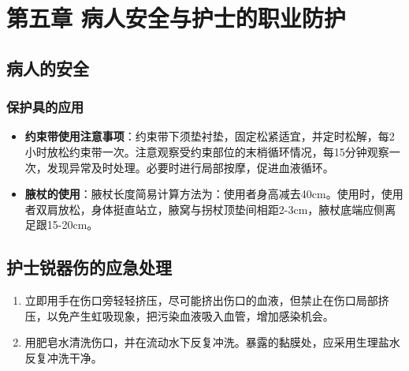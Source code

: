 \documentclass[11pt, a4paper]{ctexart}
\begin{document}
\section{第五章 病人安全与护士的职业防护}
\subsection{病人的安全}
\subsubsection{保护具的应用}
\begin{itemize}
	\item \textbf{约束带使用注意事项}：约束带下须垫衬垫，固定松紧适宜，并定时松解，每2小时放松约束带一次。注意观察受约束部位的末梢循环情况，每15分钟观察一次，发现异常及时处理。必要时进行局部按摩，促进血液循环。
	\item \textbf{腋杖的使用}：腋杖长度简易计算方法为：使用者身高减去40cm。使用时，使用者双肩放松，身体挺直站立，腋窝与拐杖顶垫间相距2-3cm，腋杖底端应侧离足跟15-20cm。
\end{itemize}

\subsection{护士锐器伤的应急处理}
\begin{enumerate}
	\item 立即用手在伤口旁轻轻挤压，尽可能挤出伤口的血液，但禁止在伤口局部挤压，以免产生虹吸现象，把污染血液吸入血管，增加感染机会。
	\item 用肥皂水清洗伤口，并在流动水下反复冲洗。暴露的黏膜处，应采用生理盐水反复冲洗干净。
\end{enumerate}
\end{document}
